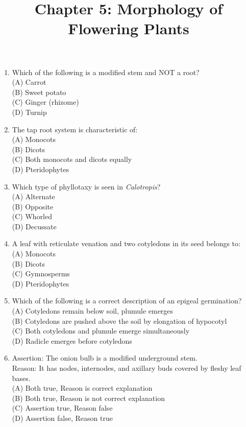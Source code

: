\documentclass{article}
\begin{document}
\title{Chapter 5: Morphology of Flowering Plants}
\date{}
\maketitle

\begin{enumerate}[label=Q\arabic*.]

\item Which of the following is a modified stem and NOT a root?
\\(A) Carrot
\\(B) Sweet potato
\\(C) Ginger (rhizome)
\\(D) Turnip

\item The tap root system is characteristic of:
\\(A) Monocots
\\(B) Dicots
\\(C) Both monocots and dicots equally
\\(D) Pteridophytes

\item Which type of phyllotaxy is seen in \textit{Calotropis}?
\\(A) Alternate
\\(B) Opposite
\\(C) Whorled
\\(D) Decussate

\item A leaf with reticulate venation and two cotyledons in its seed belongs to:
\\(A) Monocots
\\(B) Dicots
\\(C) Gymnosperms
\\(D) Pteridophytes

\item Which of the following is a correct description of an epigeal germination?
\\(A) Cotyledons remain below soil, plumule emerges
\\(B) Cotyledons are pushed above the soil by elongation of hypocotyl
\\(C) Both cotyledons and plumule emerge simultaneously
\\(D) Radicle emerges before cotyledons

\item Assertion: The onion bulb is a modified underground stem.\\
Reason: It has nodes, internodes, and axillary buds covered by fleshy leaf bases.
\\(A) Both true, Reason is correct explanation
\\(B) Both true, Reason is not correct explanation
\\(C) Assertion true, Reason false
\\(D) Assertion false, Reason true


\end{enumerate}
\end{document}
